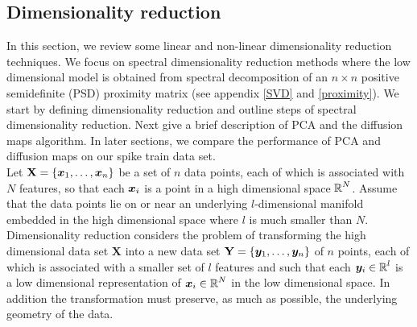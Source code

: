 
\subsection{Dimensionality reduction}
In this section, we review some linear and non-linear dimensionality reduction techniques. We focus on spectral dimensionality reduction methods where the low dimensional model is obtained from spectral decomposition of an $n \times n$ positive semidefinite (PSD) proximity matrix (see appendix \ref{SVD} and \ref{proximity}). We start by defining dimensionality reduction and outline steps of spectral dimensionality reduction. Next give a brief description of PCA and the diffusion maps algorithm. In later sections, we compare the performance of PCA and diffusion maps on our spike train data set.\\

Let $\textbf{X} = \displaystyle \{\boldsymbol{x}_{1}, \ldots , \boldsymbol{x}_{n} \}$
be a set of $n$ data points, each of which is associated with $N$ features, so that each $\boldsymbol{x}_{i}$ is a point in a high dimensional space $\operatorname{\mathbb{R}}^{N}$. Assume that the data points lie on or near an underlying $l$-dimensional manifold embedded in the high dimensional space where $l$ is much smaller than $N$. Dimensionality reduction considers the problem of  transforming the high dimensional data set
$\textbf{X}$ into a new data set $\textbf{Y} = \displaystyle \{ \boldsymbol{y}_{1}, \ldots, \boldsymbol{y}_{n} \}$  of $n$ points, each of which is associated
with a smaller set of $l$ features and such that each $\boldsymbol{y}_{i} \in \operatorname{\mathbb{R}}^{l}$ is a low dimensional representation of $\boldsymbol{x}_{i} \in \operatorname{\mathbb{R}}^{N}$ in the low dimensional space. In addition the transformation must preserve, as much as possible, the underlying geometry of the data.\\

